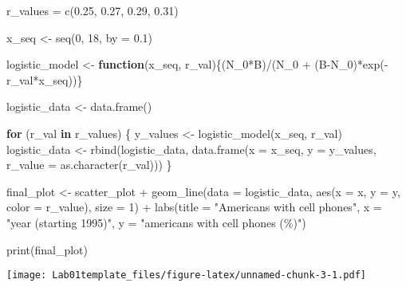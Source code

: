 \documentclass[
]{article}
\newenvironment{Shaded}{\begin{snugshade}}{\end{snugshade}}
\newcommand{\AttributeTok}[1]{\textcolor[rgb]{0.77,0.63,0.00}{#1}}
\newcommand{\ControlFlowTok}[1]{\textcolor[rgb]{0.13,0.29,0.53}{\textbf{#1}}}
\newcommand{\DecValTok}[1]{\textcolor[rgb]{0.00,0.00,0.81}{#1}}
\newcommand{\FloatTok}[1]{\textcolor[rgb]{0.00,0.00,0.81}{#1}}
\newcommand{\FunctionTok}[1]{\textcolor[rgb]{0.00,0.00,0.00}{#1}}
\newcommand{\NormalTok}[1]{#1}
\newcommand{\OtherTok}[1]{\textcolor[rgb]{0.56,0.35,0.01}{#1}}
\newcommand{\SpecialCharTok}[1]{\textcolor[rgb]{0.00,0.00,0.00}{#1}}
\newcommand{\StringTok}[1]{\textcolor[rgb]{0.31,0.60,0.02}{#1}}
\begin{document}
\begin{Shaded}
\begin{Highlighting}[]
\NormalTok{r\_values }\OtherTok{=} \FunctionTok{c}\NormalTok{(}\FloatTok{0.25}\NormalTok{, }\FloatTok{0.27}\NormalTok{, }\FloatTok{0.29}\NormalTok{, }\FloatTok{0.31}\NormalTok{)}

\NormalTok{x\_seq }\OtherTok{\textless{}{-}} \FunctionTok{seq}\NormalTok{(}\DecValTok{0}\NormalTok{, }\DecValTok{18}\NormalTok{, }\AttributeTok{by =} \FloatTok{0.1}\NormalTok{)}

\NormalTok{logistic\_model }\OtherTok{\textless{}{-}} \ControlFlowTok{function}\NormalTok{(x\_seq, r\_val)\{(N\_0}\SpecialCharTok{*}\NormalTok{B)}\SpecialCharTok{/}\NormalTok{(N\_0 }\SpecialCharTok{+}\NormalTok{ (B}\SpecialCharTok{{-}}\NormalTok{N\_0)}\SpecialCharTok{*}\FunctionTok{exp}\NormalTok{(}\SpecialCharTok{{-}}\NormalTok{r\_val}\SpecialCharTok{*}\NormalTok{x\_seq))\}}


\NormalTok{logistic\_data }\OtherTok{\textless{}{-}} \FunctionTok{data.frame}\NormalTok{()}

\ControlFlowTok{for}\NormalTok{ (r\_val }\ControlFlowTok{in}\NormalTok{ r\_values) \{}
\NormalTok{  y\_values }\OtherTok{\textless{}{-}} \FunctionTok{logistic\_model}\NormalTok{(x\_seq, r\_val)}
\NormalTok{  logistic\_data }\OtherTok{\textless{}{-}} \FunctionTok{rbind}\NormalTok{(logistic\_data, }\FunctionTok{data.frame}\NormalTok{(}\AttributeTok{x =}\NormalTok{ x\_seq, }\AttributeTok{y =}\NormalTok{ y\_values, }\AttributeTok{r\_value =} \FunctionTok{as.character}\NormalTok{(r\_val)))}
\NormalTok{\}}


\NormalTok{final\_plot }\OtherTok{\textless{}{-}}\NormalTok{ scatter\_plot }\SpecialCharTok{+}
  \FunctionTok{geom\_line}\NormalTok{(}\AttributeTok{data =}\NormalTok{ logistic\_data, }\FunctionTok{aes}\NormalTok{(}\AttributeTok{x =}\NormalTok{ x, }\AttributeTok{y =}\NormalTok{ y, }\AttributeTok{color =}\NormalTok{ r\_value), }\AttributeTok{size =} \DecValTok{1}\NormalTok{) }\SpecialCharTok{+}
  \FunctionTok{labs}\NormalTok{(}\AttributeTok{title =} \StringTok{"Americans with cell phones"}\NormalTok{,}
       \AttributeTok{x =} \StringTok{"year (starting 1995)"}\NormalTok{,}
       \AttributeTok{y =} \StringTok{"americans with cell phones (\%)"}\NormalTok{)}

\FunctionTok{print}\NormalTok{(final\_plot)}
\end{Highlighting}
\end{Shaded}

\texttt{[image: Lab01template\_files/figure-latex/unnamed-chunk-3-1.pdf]}
\end{document}
